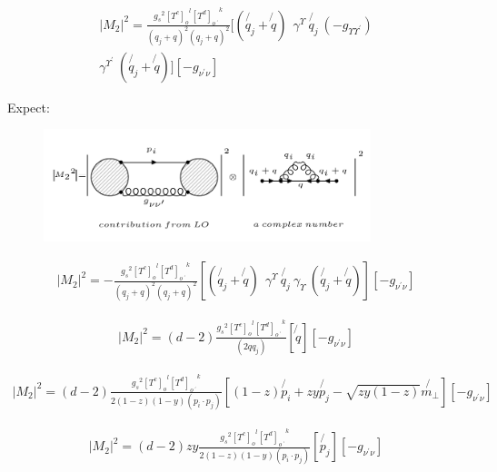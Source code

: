 \begin{equation}
\begin{split}
|M_2|^2=\frac{{g_s}^2 {[T^c]_o}^l {[T^d]_{o\:^{\prime}}}^k}{(q_j + q)^2 (q_j + q)^2}
[(\not{q_j} + \not{q}) \:
 \:  \gamma^{\Upsilon} \: \not{q_j} \: (-g_{{\Upsilon}{{\Upsilon}^{\prime}}}) \\
\gamma^{{\Upsilon}^{\prime}} \: (\not{q_j} + \not{q})]
[-g_{{\nu}^{\prime}{\nu}}]
\end{split}
\end{equation}

Expect:
\begin{figure}[h!]
\centering
\includegraphics[width=0.85\textwidth]{images/expectationqg-g.png}
\end{figure}

\begin{equation}
\begin{split}
|M_2|^2=-\frac{{g_s}^2 {[T^c]_o}^l {[T^d]_{o\:^{\prime}}}^k}{(q_j + q)^2 (q_j + q)^2}
[(\not{q_j} + \not{q}) \:
 \:  \gamma^{\Upsilon} \: \not{q_j} \: 
{\gamma}_{\Upsilon} \: (\not{q_j} + \not{q})]
[-g_{{\nu}^{\prime}{\nu}}]
\end{split}
\end{equation}

\begin{equation}
\begin{split}
|M_2|^2=(d-2)\frac{{g_s}^2 {[T^c]_o}^l {[T^d]_{o\:^{\prime}}}^k}{(2qq_j)}
[\not{q}]
[-g_{{\nu}^{\prime}{\nu}}]
\end{split}
\end{equation}

\begin{equation}
\begin{split}
|M_2|^2=(d-2)\frac{{g_s}^2 {[T^c]_o}^l {[T^d]_{o\:^{\prime}}}^k}{2(1-z)(1-y)(p_i \cdot p_j)}
[(1-z) \not{p_i}+zy \not{p_j} - \sqrt{zy(1-z)} \not{{m}_{\bot}}]
[-g_{{\nu}^{\prime}{\nu}}]
\end{split}
\end{equation}

\begin{equation}
\begin{split}
|M_2|^2=(d-2)zy\frac{{g_s}^2 {[T^c]_o}^l {[T^d]_{o\:^{\prime}}}^k}{2(1-z)(1-y)(p_i \cdot p_j)}
[\not{p_j}]
[-g_{{\nu}^{\prime}{\nu}}]
\end{split}
\end{equation}







